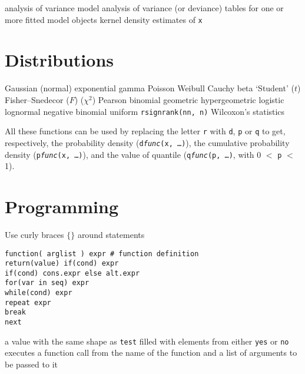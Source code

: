 	{analysis of variance model}
	{analysis of variance (or deviance) tables for one or more fitted model objects}
	{kernel density estimates of {\tt x}}

\section{Distributions}{}
	{Gaussian (normal)}
	{exponential}
	{gamma}
	{Poisson}
	{Weibull}
	{Cauchy}
	{beta}
	{`Student' ($t$)}
	{Fisher--Snedecor ($F$)  ($\chi^2$)}
	{Pearson}
	{binomial}
	{geometric}
	{hypergeometric}
	{logistic}
	{lognormal}
	{negative binomial}
	{uniform}
	{{\tt rsignrank(nn, n)} Wilcoxon's statistics}

All these functions can be used by replacing the letter {\tt r} with
{\tt d}, {\tt p} or {\tt q} to get, respectively, the probability
density ({\tt d{\it func}(x, \ldots)}), the cumulative probability
density ({\tt p{\it func}(x, \ldots)}), and the value of quantile
({\tt q{\it func}(p, \ldots)}, with 0 $<$ {\tt p} $<$ 1).

\section{Programming}{ Use curly braces $\lbrace\rbrace$ around statements }

{\tt function( arglist ) expr \# function definition\\ return(value) if(cond)
    expr\\ if(cond) cons.expr else  alt.expr\\ for(var in seq) expr\\
    while(cond) expr\\ repeat expr\\ break\\ next\\ }


	{a value with the same shape as {\tt test} filled with elements from either {\tt yes} or {\tt no}}
	{executes a function call from the name of the function and a list of arguments to be passed to it}

